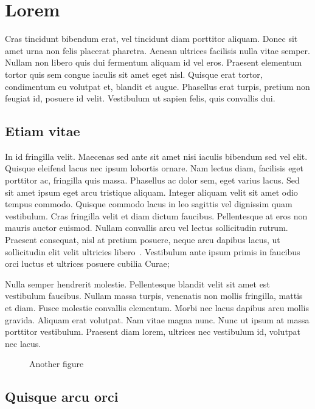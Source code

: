 \chapter{Lorem}
\label{section:lorem}

Cras tincidunt bibendum erat, vel tincidunt diam porttitor aliquam. Donec sit amet urna non felis placerat pharetra. Aenean ultrices facilisis nulla vitae semper. Nullam non libero quis dui fermentum aliquam id vel eros. Praesent elementum tortor quis sem congue iaculis sit amet eget nisl. Quisque erat tortor, condimentum eu volutpat et, blandit et augue. Phasellus erat turpis, pretium non feugiat id, posuere id velit. Vestibulum ut sapien felis, quis convallis dui.

\section{Etiam vitae}
\label{section:lorem:etiam}

In id fringilla velit. Maecenas sed ante sit amet nisi iaculis bibendum sed vel elit. Quisque eleifend lacus nec ipsum lobortis ornare. Nam lectus diam, facilisis eget porttitor ac, fringilla quis massa. Phasellus ac dolor sem, eget varius lacus. Sed sit amet ipsum eget arcu tristique aliquam. Integer aliquam velit sit amet odio tempus commodo. Quisque commodo lacus in leo sagittis vel dignissim quam vestibulum. Cras fringilla velit et diam dictum faucibus. Pellentesque at eros non mauris auctor euismod. Nullam convallis arcu vel lectus sollicitudin rutrum. Praesent consequat, nisl at pretium posuere, neque arcu dapibus lacus, ut sollicitudin elit velit ultricies libero~\cite{Author:06}. Vestibulum ante ipsum primis in faucibus orci luctus et ultrices posuere cubilia Curae;

Nulla semper hendrerit molestie. Pellentesque blandit velit sit amet est vestibulum faucibus. Nullam massa turpis, venenatis non mollis fringilla, mattis et diam. Fusce molestie convallis elementum. Morbi nec lacus dapibus arcu mollis gravida. Aliquam erat volutpat. Nam vitae magna nunc. Nunc ut ipsum at massa porttitor vestibulum. Praesent diam lorem, ultrices nec vestibulum id, volutpat nec lacus.

\begin{figure}[ht]
	\centering
	
	\caption{Another figure}
	\label{figure:another}
\end{figure}

\section{Quisque arcu orci}
\label{section:lorem:quisque}

